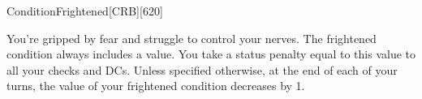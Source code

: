 
\begin{card}{Condition}{}{Frightened}[CRB][620]

You're gripped by fear and struggle to control your nerves.
The frightened condition always includes a value.
You take a status penalty equal to this value to all your checks and DCs.
Unless specified otherwise, at the end of each of your turns, the value of your frightened condition decreases by 1.

\end{card}

